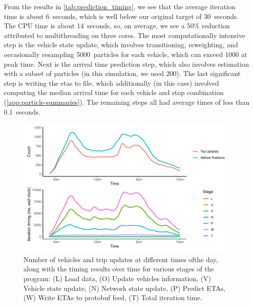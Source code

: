 From the results in \cref{tab:prediction_timing}, we see that the average iteration time is about 6~seconds, which is well below our original target of 30~seconds. The CPU time is about 14~seconds, so, on average, we see a 50\% reduction attributed to multithreading on three cores. The most computationally intensive step is the vehicle state update, which involves transitioning, reweighting, and occasionally resampling 5000~particles for each vehicle, which can exceed 1000 at peak time. Next is the arrival time prediction step, which also involves estimation with a subset of particles (in this simulation, we used 200). The last significant step is writing the \glspl{eta} to file, which additionally (in this case) involved computing the median arrival time for each vehicle and stop combination (\cref{app:particle-summaries}). The remaining steps all had average times of less than 0.1~seconds.



\begin{knitrout}\small
{}\color{fgcolor}\begin{figure}

{\centering \includegraphics[width=\textwidth]{figure/prediction_timing_time-1} 

}

\caption[Number of vehicles and trip updates at different times ofthe day, along with the timing results over time for various stages of the program]{Number of vehicles and trip updates at different times ofthe day, along with the timing results over time for various stages of the program: (L) Load data, (O) Update vehicles information, (V) Vehicle state update, (N) Network state update, (P) Predict ETAs, (W) Write ETAs to protobuf feed, (T) Total iteration time.}\label{fig:prediction_timing_time}
\end{figure}


\end{knitrout}



